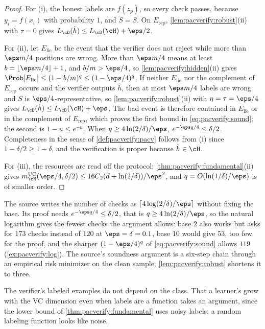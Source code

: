 \begin{refsection}
\begin{proof}
For (i), the honest labels are $f(z_p)$, so every check passes, because $y_i=f(x_i)$ with probability $1$, and $\tilde S=S$. On $E_{\mathrm{rep}}$, \cref{lem:pacverify:robust}(ii) with $\tau=0$ gives $L_\cD(\hat h)\le L_\cD(\cH)+\eps/2$.

For (ii), let $E_{\mathrm{lie}}$ be the event that the verifier does not reject while more than $\eps m/4$ positions are wrong. More than $\eps m/4$ means at least $b=\lfloor\eps m/4\rfloor+1$, and $b/m>\eps/4$, so \cref{lem:pacverify:hidden}(ii) gives $\Prob[E_{\mathrm{lie}}]\le(1-b/m)^q\le(1-\eps/4)^q$. If neither $E_{\mathrm{lie}}$ nor the complement of $E_{\mathrm{rep}}$ occurs and the verifier outputs $\hat h$, then at most $\eps m/4$ labels are wrong and $S$ is $\eps/4$-representative, so \cref{lem:pacverify:robust}(ii) with $\eta=\tau=\eps/4$ gives $L_\cD(\hat h)\le L_\cD(\cH)+\eps$. The bad event is therefore contained in $E_{\mathrm{lie}}$ or in the complement of $E_{\mathrm{rep}}$, which proves the first bound in \eqref{eq:pacverify:sound}; the second is $1-u\le e^{-u}$. When $q\ge4\ln(2/\delta)/\eps$, $e^{-\eps q/4}\le\delta/2$. Completeness in the sense of \cref{def:pacverify:pacv} follows from (i) since $1-\delta/2\ge1-\delta$, and the verification is proper because $\hat h\in\cH$.

For (iii), the resources are read off the protocol; \cref{thm:pacverify:fundamental}(ii) gives $\pacverifyuc(\eps/4,\delta/2)\le16C_2(d+\ln(2/\delta))/\eps^2$, and $q=O(\ln(1/\delta)/\eps)$ is of smaller order.
\end{proof}

The source writes the number of checks as $\lceil4\log(2/\delta)/\eps\rceil$ without fixing the base. Its proof needs $e^{-\eps q/4}\le\delta/2$, that is $q\ge4\ln(2/\delta)/\eps$, so the natural logarithm gives the fewest checks the argument allows: base $2$ also works but asks for $173$ checks instead of $120$ at $\eps=\delta=0.1$, base $10$ would give $53$, too few for the proof, and the sharper $(1-\eps/4)^q$ of \eqref{eq:pacverify:sound} allows $119$ (\cref{ex:pacverify:log}). The source's soundness argument is a six-step chain through an empirical risk minimizer on the clean sample; \cref{lem:pacverify:robust} shortens it to three.

The verifier's labeled examples do not depend on the class. That a learner's grow with the VC dimension even when labels are a function takes an argument, since the lower bound of \cref{thm:pacverify:fundamental} uses noisy labels; a random labeling function looks like noise.


\end{refsection}
